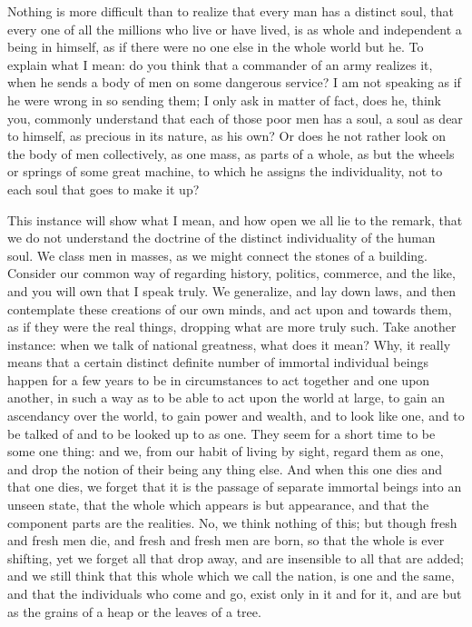 Nothing is more difficult than to realize that every man has a
distinct soul, that every one of all the millions who live or have
lived, is as whole and independent a being in himself, as if there
were no one else in the whole world but he. To explain what I mean: do
you think that a commander of an army realizes it, when he sends a
body of men on some dangerous service? I am not speaking as if he were
wrong in so sending them; I only ask in matter of fact, does he, think
you, commonly understand that each of those poor men has a soul, a
soul as dear to himself, as precious in its nature, as his own? Or
does he not rather look on the body of men collectively, as one mass,
as parts of a whole, as but the wheels or springs of some great
machine, to which he assigns the individuality, not to each soul that
goes to make it up?

This instance will show what I mean, and how open we all lie to the
remark, that we do not understand the doctrine of the distinct
individuality of the human soul. We class men in masses, as we might
connect the stones of a building. Consider our common way of regarding
history, politics, commerce, and the like, and you will own that I
speak truly. We generalize, and lay down laws, and then contemplate
these creations of our own minds, and act upon and towards them, as if
they were the real things, dropping what are more truly such. Take
another instance: when we talk of national greatness, what does it
mean? Why, it really means that a certain distinct definite number of
immortal individual beings happen for a few years to be in
circumstances to act together and one upon another, in such a way as
to be able to act upon the world at large, to gain an ascendancy over
the world, to gain power and wealth, and to look like one, and to be
talked of and to be looked up to as one. They seem for a short time to
be some one thing: and we, from our habit of living by sight, regard
them as one, and drop the notion of their being any thing else. And
when this one dies and that one dies, we forget that it is the passage
of separate immortal beings into an unseen state, that the whole which
appears is but appearance, and that the component parts are the
realities. No, we think nothing of this; but though fresh and fresh
men die, and fresh and fresh men are born, so that the whole is ever
shifting, yet we forget all that drop away, and are insensible to all
that are added; and we still think that this whole which we call the
nation, is one and the same, and that the individuals who come and go,
exist only in it and for it, and are but as the grains of a heap or
the leaves of a tree.

